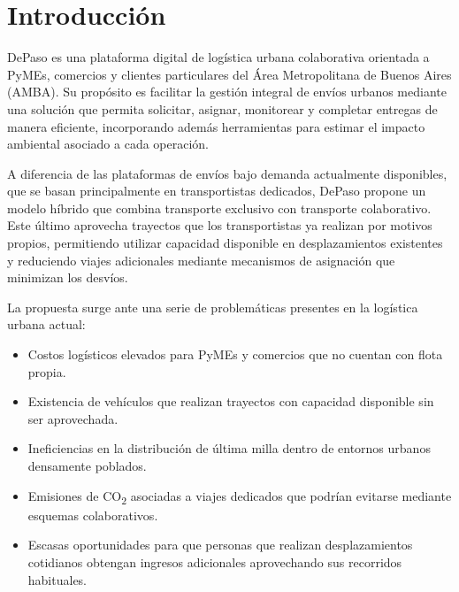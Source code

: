 \chapter{Introducción}
\label{cap:introduccion}

DePaso es una plataforma digital de logística urbana colaborativa orientada a PyMEs, comercios y clientes particulares del Área Metropolitana de Buenos Aires (AMBA). Su propósito es facilitar la gestión integral de envíos urbanos mediante una solución que permita solicitar, asignar, monitorear y completar entregas de manera eficiente, incorporando además herramientas para estimar el impacto ambiental asociado a cada operación.

A diferencia de las plataformas de envíos bajo demanda actualmente disponibles, que se basan principalmente en transportistas dedicados, DePaso propone un modelo híbrido que combina transporte exclusivo con transporte colaborativo. Este último aprovecha trayectos que los transportistas ya realizan por motivos propios, permitiendo utilizar capacidad disponible en desplazamientos existentes y reduciendo viajes adicionales mediante mecanismos de asignación que minimizan los desvíos.

La propuesta surge ante una serie de problemáticas presentes en la logística urbana actual:

\begin{itemize}[leftmargin=2em]
    \item Costos logísticos elevados para PyMEs y comercios que no cuentan con flota propia.
    \item Existencia de vehículos que realizan trayectos con capacidad disponible sin ser aprovechada.
    \item Ineficiencias en la distribución de última milla dentro de entornos urbanos densamente poblados.
    \item Emisiones de CO\textsubscript{2} asociadas a viajes dedicados que podrían evitarse mediante esquemas colaborativos.
    \item Escasas oportunidades para que personas que realizan desplazamientos cotidianos obtengan ingresos adicionales aprovechando sus recorridos habituales.
\end{itemize}

